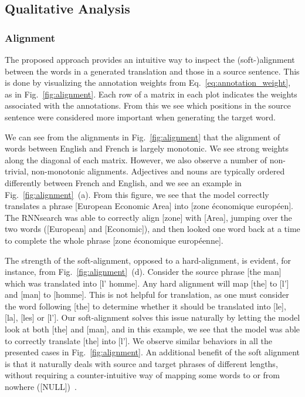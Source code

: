 \subsection{Qualitative Analysis}

\subsubsection{Alignment}

The proposed approach provides an intuitive way to inspect the
\mbox{(soft-)alignment} between the words in a generated translation and those
in a source sentence.  This is done by visualizing the annotation weights
 from Eq.~\eqref{eq:annotation_weight}, as in
Fig.~\ref{fig:alignment}. Each row of a matrix in each plot indicates the
weights associated with the annotations. From this we see which positions in the
source sentence were considered more important when generating the target word. 

We can see from the alignments in Fig.~\ref{fig:alignment} that the alignment of
words between English and French is largely monotonic. We see strong weights
along the diagonal of each matrix. However, we also observe a number of
non-trivial, non-monotonic alignments. Adjectives and nouns are typically
ordered differently between French and English, and we see an example in
Fig.~\ref{fig:alignment}~(a). From this figure, we see that the model correctly
translates a phrase [European Economic Area] into [zone \'economique
europ\'een]. The RNNsearch was able to correctly align [zone] with [Area],
jumping over the two words ([European] and [Economic]), and then looked one word
back at a time to complete the whole phrase [zone \'economique europ\'eenne]. 

The strength of the soft-alignment, opposed to a hard-alignment, is evident, for
instance, from Fig.~\ref{fig:alignment}~(d). Consider the source phrase [the
man] which was translated into [l' homme]. Any hard alignment will map [the] to
[l'] and [man] to [homme]. This is not helpful for translation, as one must
consider the word following [the] to determine whether it should be translated
into [le], [la], [les] or [l'].  Our soft-alignment solves this issue naturally
by letting the model look at both [the] and [man], and in this example, we see
that the model was able to correctly translate [the] into [l']. We observe
similar behaviors in all the presented cases in Fig.~\ref{fig:alignment}. An
additional benefit of the soft alignment is that it naturally deals with source
and target phrases of different lengths, without requiring a counter-intuitive
way of mapping some words to or from nowhere ([NULL])~\citep[see, e.g.,
Chapters~4 and 5 of][]{Koehn2010}.

